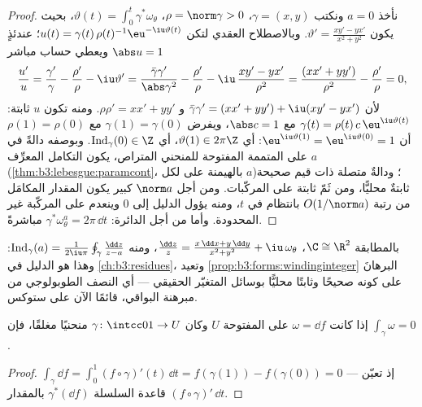 \begin{proof}
نأخذ $a = 0$ ونكتب $\gamma = (x, y)$، $\rho =
\norm\gamma > 0$، $\vartheta(t) =
\int_0^t\gamma^*\omega_\theta$، بحيث يكون $\vartheta' =
\frac{xy' - yx'}{x^2 + y^2}$.
وبالاصطلاح العقدي لتكن $u(t)
= \gamma(t)\,\rho(t)^{-1}\eu^{-\iu\vartheta(t)}$؛ عندئذٍ $\abs u = 1$ ويعطي حساب
مباشر
\[
\frac{u'}{u} = \frac{\gamma'}{\gamma} - \frac{\rho'}{\rho}
- \iu\vartheta'
= \frac{\bar\gamma\gamma'}{\abs\gamma^2} -
\frac{\rho'}{\rho} - \iu\,\frac{xy' -
yx'}{\rho^2}
= \frac{(xx' + yy')}{\rho^2} - \frac{\rho'}{\rho} = 0,
\]
لأن $\bar\gamma\gamma' = (xx' + yy') + \iu(xy' - yx')$ و $\rho\rho' = xx' + yy'$. ومنه تكون $u$ ثابتة: $\gamma(t) =
\rho(t)\,c\,\eu^{\iu\vartheta(t)}$ مع
$\abs c = 1$، ويفرض $\gamma(1) = \gamma(0)$ مع $\rho(1) = \rho(0)$ أن $\eu^{\iu\vartheta(1)} = \eu^{\iu\vartheta(0)} = 1$: أي $\vartheta(1) \in 2\pi\Z$،
أي $\operatorname{Ind}_\gamma(0) \in \Z$. وبوصفه دالةً في $a$ على المتممة المفتوحة للمنحني
المتراص، يكون التكامل المعرِّف  (\cref{thm:b3:lebesgue:paramcont}، بالهيمنة
على  لكل $a$)؛ ودالةٌ متصلة ذات قيم صحيحة ثابتةٌ محليًّا،
ومن ثَمّ ثابتة على المركّبات. ومن أجل $\norm a$ كبير يكون
المقدار المكامَل من رتبة $O(1/\norm a)$ بانتظام في $t$، ومنه
يؤول الدليل إلى $0$ وينعدم على المركّبة غير المحدودة. وأما من
أجل الدائرة: $\gamma^*\omega_\theta^a = 2\pi\,\dd t$ مباشرةً.
\end{proof}

\begin{remark}
بالمطابقة $\C \cong \R^2$، $\frac{\dd z}{z} = \frac{x\,\dd x +
y\,\dd y}{x^2 + y^2} + \iu\,\omega_\theta$، ومنه $\operatorname{Ind}_\gamma(a) =
\frac1{2\iu\pi}\oint_\gamma\frac{\dd z}{z - a}$: وهذا هو
الدليل في \cref{ch:b3:residues}، وتعيد \cref{prop:b3:forms:windinginteger} البرهانَ على كونه
صحيحًا وثابتًا محليًّا بوسائل المتغيّر الحقيقي --- أي النصف
الطوبولوجي من مبرهنة البواقي، قائمًا الآن على ستوكس.
\end{remark}

\begin{proposition}\label{prop:b3:forms:exactloop}
إذا كانت $\omega = \dd f$  على المفتوحة $U$ وكان $\gamma\colon\intcc01\to U$
منحنيًا مغلقًا، فإن $\int_\gamma\omega = 0$.
\end{proposition}

\begin{proof}
$\int_\gamma\dd f = \int_0^1(f\circ\gamma)'(t)\,\dd t =
f(\gamma(1)) - f(\gamma(0)) = 0$ --- إذ تعيّن قاعدة السلسلة $\gamma^*(\dd f)$ بالمقدار $(f\circ\gamma)'\,\dd t$.
\end{proof}


